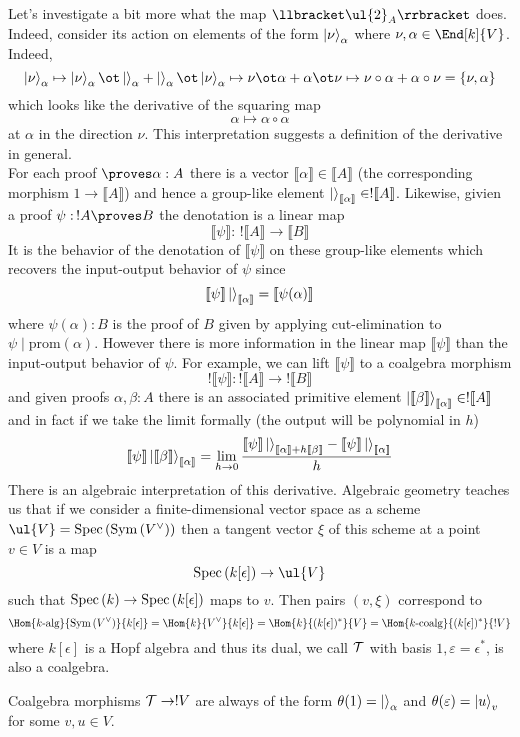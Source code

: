 \documentclass[12pt]{article}
\newcommand{\br}[1]{\llbracket #1 \rrbracket}
\begin{document}
Let's investigate a bit more what the map $\br{\ul{2}_A}$ does. Indeed, consider its action on elements of the form $\left| \nu \right>_\alpha$ where $\nu, \alpha \in \End[k]{V}$. Indeed,
\[ \ket{\nu}_\alpha \mapsto \ket{\nu}_\alpha \ot \ket{\empty}_\alpha + \ket{\empty}_\alpha \ot \ket{\nu}_\alpha \mapsto \nu \ot \alpha + \alpha \ot \nu \mapsto \nu \circ \alpha + \alpha \circ \nu = \{ \nu, \alpha \} \] 
which looks like the derivative of the squaring map 
\[ \alpha \mapsto \alpha \circ \alpha \]
at $\alpha$ in the direction $\nu$. This interpretation suggests a definition of the derivative in general. 
\bigskip\\
For each proof $\proves \alpha : A$ there is a vector $\br{\alpha} \in \br{A}$ (the corresponding morphism $1 \to \br{A}$) and hence a group-like element $\ket{\empty}_{\br{\alpha}} \in ! \br{A}$. Likewise, givien a proof $\psi : \, !A \proves B$ the denotation is a linear map
\[ \br{\psi} : \, ! \br{A} \to \br{B} \]
It is the behavior of the denotation of $\br{\psi}$ on these group-like elements which recovers the input-output behavior of $\psi$ since
\[ \br{\psi} \ket{\empty}_{\br{\alpha}} = \br{\psi(\alpha)} \]
where $\psi(\alpha) : B$ is the proof of $B$ given by applying cut-elimination to $\psi \mid \text{prom}(\alpha)$. However there is more information in the linear map $\br{\psi}$ than the input-output behavior of $\psi$. For example, we can lift $\br{\psi}$ to a coalgebra morphism
\[ ! \br{\psi} : ! \br{A} \to ! \br{B} \]
and given proofs $\alpha, \beta : A$ there is an associated primitive element $\ket{\br{\beta}}_{\br{\alpha}} \in ! \br{A}$ and in fact if we take the limit formally (the output will be polynomial in $h$)
\[ \br{\psi} \ket{\br{\beta}}_{\br{\alpha}} = \lim_{h \to 0} \frac{\br{\psi} \ket{\empty}_{\br{\alpha} + h \br{\beta}} - \br{\psi} \ket{\empty}_{\br{\alpha}}}{h} \]
There is an algebraic interpretation of this derivative. Algebraic geometry teaches us that if we consider a finite-dimensional vector space as a scheme $\ul{V} = \Spec{\Sym{V^\vee}}$ then a tangent vector $\xi$ of this scheme at a point $v \in V$ is a map
\[ \Spec{k[\epsilon]} \to \ul{V} \]
such that $\mathrm{Spec}\left( k \right) \to \mathrm{Spec}\left( k[\epsilon] \right)$ maps to $v$. Then pairs $(v, \xi)$ correspond to 
\[ \Hom{k\text{-alg}}{\Sym{V^\vee}}{k[\epsilon]} = \Hom{k}{V^\vee}{k[\epsilon]} = \Hom{k}{(k[\epsilon])^*}{V} = \Hom{k\text{-coalg}}{(k[\epsilon])^*}{!V} \]
where $k[\epsilon]$ is a Hopf algebra and thus its dual, we call $\mathcal{T}$ with basis $1, \varepsilon = \epsilon^*$, is also a coalgebra. 

\begin{lemma}
Coalgebra morphisms $\mathcal{T} \to ! V$ are always of the form $\theta(1) = \ket{\empty}_\alpha$ and $\theta(\varepsilon) = \left| u \right>_v$ for some $v,u \in V$. 
\end{lemma}
\end{document}
